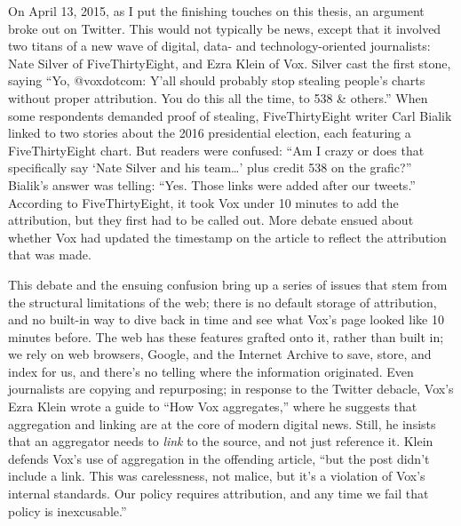 On April 13, 2015, as I put the finishing touches on this thesis, an argument broke out on Twitter. This would not typically be news, except that it involved two titans of a new wave of digital, data- and technology-oriented journalists: Nate Silver of FiveThirtyEight, and Ezra Klein of Vox. Silver cast the first stone, saying ``Yo, @voxdotcom: Y'all should probably stop stealing people's charts without proper attribution. You do this all the time, to 538 \& others.''\autocite{silver_yo_2015} When some respondents demanded proof of stealing, FiveThirtyEight writer Carl Bialik linked to two stories about the 2016 presidential election, each featuring a FiveThirtyEight chart. But readers were confused: ``Am I crazy or does that specifically say `Nate Silver and his team\ldots' plus credit 538 on the grafic?'' Bialik's answer was telling: ``Yes. Those links were added after our tweets.''\autocite{bialik_samslusher_2015} According to FiveThirtyEight, it took Vox under 10 minutes to add the attribution, but they first had to be called out. More debate ensued about whether Vox had updated the timestamp on the article to reflect the attribution that was made.

This debate and the ensuing confusion bring up a series of issues that stem from the structural limitations of the web; there is no default storage of attribution, and no built-in way to dive back in time and see what Vox's page looked like 10 minutes before. The web has these features grafted onto it, rather than built in; we rely on web browsers, Google, and the Internet Archive to save, store, and index for us, and there's no telling where the information originated. Even journalists are copying and repurposing; in response to the Twitter debacle, Vox's Ezra Klein wrote a guide to ``How Vox aggregates,'' where he suggests that aggregation and linking are at the core of modern digital news. Still, he insists that an aggregator needs to \emph{link} to the source, and not just reference it. Klein defends Vox's use of aggregation in the offending article, ``but the post didn't include a link. This was carelessness, not malice, but it's a violation of Vox's internal standards. Our policy requires attribution, and any time we fail that policy is inexcusable.''\autocite{klein_how_2015}

